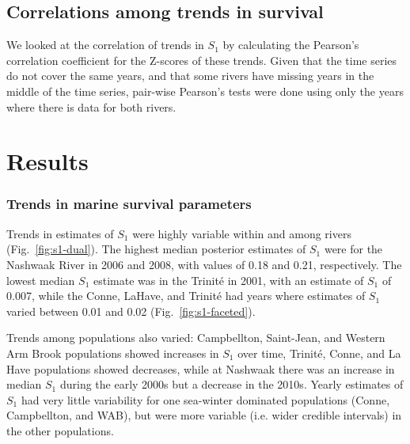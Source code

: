 \documentclass[12pt]{article}
\newcommand{\So}{$S_{1}$\xspace}
\newcommand{\comment}[1]{\par {\bfseries \color{blue} #1 \par}} %
\begin{document}
\subsection*{Correlations among trends in survival}


We looked at the correlation of trends in \So by calculating the Pearson's
correlation coefficient for the Z-scores of these trends. Given that the time
series do not cover the same years, and that some rivers have missing years in
the middle of the time series, pair-wise Pearson's tests were done using only
the years where there is data for both rivers.

\section*{Results}


\subsubsection*{Trends in marine survival parameters}

Trends in estimates of \So were highly variable within and among rivers
(Fig.~\ref{fig:s1-dual}). The highest median posterior estimates of \So
were for the Nashwaak River in 2006 and 2008, with values of 0.18 and 0.21,
respectively. The lowest median \So estimate was in the Trinit\'{e} in 2001,
with an estimate of \So of 0.007, while the Conne, LaHave, and Trinit\'{e} had
years where estimates of \So varied between 0.01 and 0.02 (Fig.~\ref{fig:s1-faceted}).

Trends among populations also varied: Campbellton,
Saint-Jean, and Western Arm Brook populations showed increases in \So
over time, Trinit\'{e}, Conne, and La Have populations showed decreases,
while at Nashwaak there was an increase in median \So during the early
2000s but a decrease in the 2010s. Yearly estimates of \So had very little
variability for one sea-winter dominated populations (Conne, Campbellton, and
WAB), but were more variable (i.e. wider credible intervals) in the other
populations.
\end{document}

